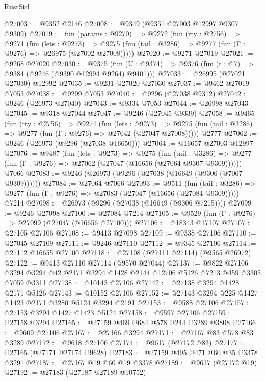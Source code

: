 \begin{lexlean}{RustStd}
\begin{coremodule}
@27003 := @9352 @2146
@27008 := @9349 (@9351 @27003 @12997 @9307 @9309)
@27019 := fun (params : @9270) =>
  @9272
    (fun (rty : @2756) =>
    @9274
      (fun (lets : @9273) =>
      @9275 (fun (tail : @3286) => @9277 (fun (Γ : @9276) => @26975 (@27002 @27008)))))
@27020 := @9271 @27019
@27021 := @9268 @27020
@27030 := @9375
    (fun (U : @9374) => @9376 (fun (t : @7) => @9384 (@9246 (@9390 @12994 @9264) @9401)))
@27033 := @26995 (@27021 @27030) @12992
@27035 := @9231 @27020 @27030
@27037 := @9462 @27019 @7053
@27038 := @9299 @7053
@27040 := @9296 (@27038 @9312)
@27042 := @9246 (@26973 @27040)
@27043 := @9334 @7053
@27044 := @26998 @27043
@27045 := @9318 @27044
@27047 := @9246 (@27045 @9339)
@27058 := @9465
    (fun (rty : @2756) =>
    @9274
      (fun (lets : @9273) =>
      @9275 (fun (tail : @3286) => @9277 (fun (Γ : @9276) => @27042 (@27047 @27008)))))
    @2777
@27062 := @9246 (@26973 (@9296 (@27038 @16650)))
@27064 := @16657 @27003 @12997
@27076 := @9487
    (fun (lets : @9273) =>
    @9275
      (fun (tail : @3286) =>
      @9277 (fun (Γ : @9276) => @27062 (@27047 (@16656 (@27064 @9307 @9309))))))
    @7066
@27083 := @9246 (@26973 (@9296 (@27038 (@16649 (@9306 (@7067 @9309))))))
@27084 := @27064 @7066
@27093 := @9511
    (fun (tail : @3286) => @9277 (fun (Γ : @9276) => @27083 (@27047 (@16656 (@27084 @9309)))))
    @7214
@27098 := @26973 (@9296 (@27038 (@16649 (@9306 @7215))))
@27099 := @9246 @27098
@27100 := @27084 @7214
@27105 := @9529 (fun (Γ : @9276) => @27099 (@27047 (@16656 @27100)))
@27106 := @18343 @17107
@27107 := @27105 @27106
@27108 := @9413 @27098
@27109 := @9338 @27106
@27110 := @27045 @27109
@27111 := @9246 @27110
@27112 := @9345 @27106
@27114 := @27112 @16655 @27100
@27118 := @27108 (@27111 @27114) (@9565 @26972)
@27122 := @9413 @27110 @27114 (@9570 @27044)
@27137 := @9822
    @27106
    @3294
    @3294
    @42
    @2171
    @3294
    @1428
    @2144
    @12706
    @5126
    @7213
    @459
    @3305
    @7059
    @3311
@27138 := @10143 @27106
@27142 := @27138 @3294 @1428 @2171 @5126
@27143 := @10152 @27106
@27152 := @27143 @3294 @225 @1427 @1423 @2171 @3280 @5124 @3294 @2191
@27153 := @9588 @27106
@27157 := @27153 @3294 @1427 @1423 @5124
@27158 := @9597 @27106
@27159 := @27158 @3294
@27165 := @27159 @469 @684 @578 @244 @3289 @3808
@27166 := @9609 @27106
@27167 := @27166 @3294
@27171 := @27167 @83 @578 @83 @3289
@27172 := @9618 @27106
@27174 := @9617 (@27172 @83)
@27177 := @27165 (@27171 @27174 @9628)
@27183 := @27159 @495 @471 @60 @35 @3378 @3291
@27187 := @27167 @19 @60 @19 @3378
@27189 := @9617 (@27172 @19)
@27192 := @27183 (@27187 @27189 @10752)

\end{coremodule}
\end{lexlean}
